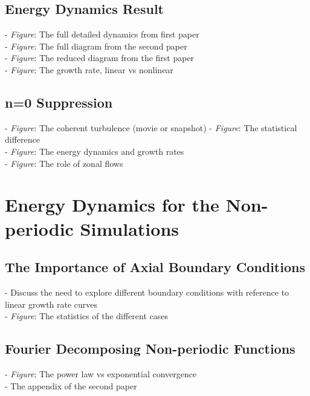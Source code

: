 \documentclass[12pt]{article}
\begin{document}
\subsection{Energy Dynamics Result}

- \emph{Figure}: The full detailed dynamics from first paper \\
- \emph{Figure}: The full diagram from the second paper \\
- \emph{Figure}: The reduced diagram from the first paper \\
- \emph{Figure}: The growth rate, linear vs nonlinear \\

\subsection{n=0 Suppression}

- \emph{Figure}: The coherent turbulence (movie or snapshot) 
- \emph{Figure}: The statistical difference \\
- \emph{Figure}: The energy dynamics and growth rates \\
- \emph{Figure}: The role of zonal flows \\

\section{Energy Dynamics for the Non-periodic Simulations}

\subsection{The Importance of Axial Boundary Conditions}

- Discuss the need to explore different boundary conditions with reference to linear growth rate curves \\
- \emph{Figure}: The statistics of the different cases \\

\subsection{Fourier Decomposing Non-periodic Functions}

- \emph{Figure}: The power law vs exponential convergence \\
- The appendix of the second paper \\
\end{document}
